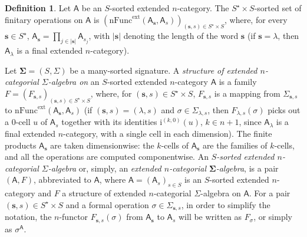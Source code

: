 \documentclass{amsart}
\newcommand{\bb}[1]{\ensuremath{\lvert #1 \rvert}}
\theoremstyle{plain}
\theoremstyle{definition}
\newtheorem{definition}[theorem]{Definition}
\begin{document}
\begin{definition}\label{DExtCatAlg}
Let $\mathsf{A}$ be an $S$-sorted extended $n$-category. The $S^{\star}\times S$-sorted set of finitary operations on $\mathsf{A}$ is $(\mathrm{nFunc}^{\mathrm{ext}}(\mathsf{A}_{\mathbf{s}},\mathsf{A}_{s}))_{(\mathbf{s},s)\in S^{\star}\times S}$, where, for every $\mathbf{s}\in S^{\star}$, $\mathsf{A}_{\mathbf{s}}=\prod_{j\in\bb{\mathbf{s}}}\mathsf{A}_{s_{j}}$, with $\bb{\mathbf{s}}$ denoting the length of the word $\mathbf{s}$ (if $\mathbf{s}=\lambda$, then $\mathsf{A}_{\lambda}$ is a final extended $n$-category). 

Let $\mathbf{\Sigma}=(S,\Sigma)$ be a many-sorted signature. 
A \emph{structure of extended $n$-categorial $\Sigma$-algebra on} an $S$-sorted extended $n$-category $\mathsf{A}$ is a family $F = (F_{\mathbf{s},s})_{(\mathbf{s},s)\in S^{\star}\times S}$, where, for $(\mathbf{s},s)\in S^{\star}\times S$, $F_{\mathbf{s},s}$ is a mapping from $\Sigma_{\mathbf{s},s}$ to $\mathrm{nFunc}^{\mathrm{ext}}(\mathsf{A}_{\mathbf{s}},\mathsf{A}_{s})$ (if $(\mathbf{s},s) = (\lambda,s)$ and $\sigma\in \Sigma_{\lambda,s}$, then $F_{\lambda,s}(\sigma)$ picks out a $0$-cell $u$ of $\mathsf{A}_{s}$ together with its identities $\mathrm{i}^{(k,0)}(u)$, $k\in n+1$, since $\mathsf{A}_{\lambda}$ is a final extended $n$-category, with a single cell in each dimension). The finite products $\mathsf{A}_{\mathbf{s}}$ are taken dimensionwise: the $k$-cells of $\mathsf{A}_{\mathbf{s}}$ are the families of $k$-cells, and all the operations are computed componentwise. An \emph{$S$-sorted extended $n$-categorial $\Sigma$-algebra} or, simply, an \emph{extended $n$-categorial $\mathbf{\Sigma}$-algebra}, is a pair $(\mathsf{A},F)$, abbreviated to $\boldsymbol{\mathsf{A}}$, where $\mathsf{A}=(\mathsf{A}_{s})_{s\in S}$ is an $S$-sorted extended $n$-category and $F$ a structure of extended $n$-categorial $\Sigma$-algebra on $\mathsf{A}$. For a pair $(\mathbf{s},s)\in S^{\star}\times S$ and a formal operation $\sigma\in \Sigma_{\mathbf{s},s}$, in order to simplify the notation, the $n$-functor $F_{\mathbf{s},s}(\sigma)$ from $\mathsf{A}_{\mathbf{s}}$ to $\mathsf{A}_{s}$ will be written as $F_{\sigma}$, or simply as $\sigma^{\boldsymbol{\mathsf{A}}}$. 


\end{definition}
\end{document}
